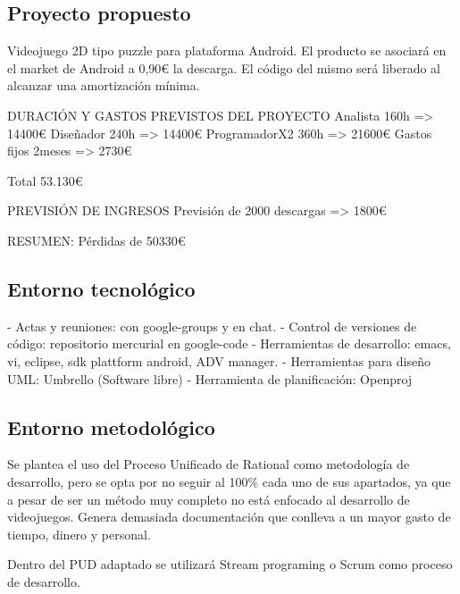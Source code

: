 \subsection{Proyecto propuesto}
Videojuego 2D tipo puzzle para plataforma Android.
El producto se asociará en el market de Android a 0,90€ la
descarga. El código del mismo será liberado al alcanzar una
amortización mínima.

DURACIÓN Y GASTOS PREVISTOS DEL PROYECTO
Analista        160h => 14400€
Diseñador       240h => 14400€
ProgramadorX2   360h => 21600€
Gastos fijos  2meses =>  2730€

Total 53.130€


PREVISIÓN DE INGRESOS
Previsión de 2000 descargas => 1800€

RESUMEN:
Pérdidas de 50330€

\subsection{Entorno tecnológico}

- Actas y reuniones: con google-groups y en chat.
- Control de versiones de código: repositorio mercurial en google-code
- Herramientas de desarrollo: emacs, vi, eclipse, sdk plattform
android,  ADV manager.
- Herramientas para diseño UML: Umbrello (Software libre)
- Herramienta de planificación: Openproj


\subsection{Entorno metodológico}
Se plantea el uso del Proceso Unificado de Rational como metodología
de desarrollo, pero se opta por no seguir al 100\% cada uno de sus
apartados, ya que a pesar de ser un método muy completo no está
enfocado al desarrollo de videojuegos. Genera demasiada documentación
que conlleva a un mayor gasto de tiempo, dinero y personal.

Dentro del PUD adaptado se utilizará Stream programing o Scrum como
proceso de desarrollo.